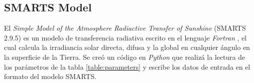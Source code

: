 \subsection{SMARTS Model}
El \textit{Simple Model of the Atmosphere Radiactive Transfer of Sunshine} (SMARTS 2.9.5) es un modelo de transferencia radiativa escrito en el lenguaje \textit{Fortran} \cite{Gueymard1995}, el cual calcula la irradiancia solar directa, difusa y la global en cualquier ángulo en la superficie de la Tierra. Se creó un código en \textit{Python} que realizá la lectura de los parámetros de la tabla \ref{table:parameters} y escribe los datos de entrada en el formato del modelo SMARTS.
